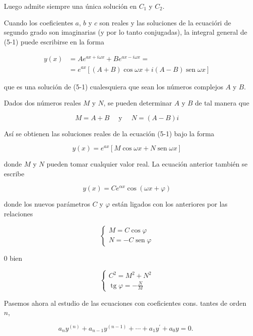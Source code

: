 \documentclass[10pt]{article}
\theoremstyle{plain}
\theoremstyle{definition}
\theoremstyle{remark}
\begin{document}
Luego admite siempre una única solución en $C_{1}$ y $C_{2}$.

Cuando los coeficientes $a$, $b$ y $c$ son reales y las soluciones de la ecuacióri de segundo grado son imaginarias (y por lo tanto conjugadas), la integral general de (5-1) puede escribirse en la forma

$$
\begin{aligned}
y(x) & =A e^{a x+i \omega x}+B e^{a x-i \omega x}= \\
& =e^{a x}[(A+B) \cos \omega x+i(A-B) \operatorname{sen} \omega x]
\end{aligned}
$$

que es una solución de (5-1) cualesquiera que sean los números complejos $A$ y $B$.

Dados dos números reales $M$ y $N$, se pueden determinar $A$ y $B$ de tal manera que

$$
M=A+B \quad \text { y } \quad N=(A-B) i
$$

Así se obtienen las soluciones reales de la ecuación (5-1) bajo la forma


\begin{equation*}
y(x)=e^{a x}[M \cos \omega x+N \operatorname{sen} \omega x] \tag{5-3}
\end{equation*}


donde $M$ y $N$ pueden tomar cualquier valor real. La ecuación anterior también se escribe


\begin{equation*}
y(x)=C e^{\alpha x} \cos (\omega x+\varphi) \tag{5-4}
\end{equation*}


donde los nuevos parámetros $C$ y $\varphi$ están ligados con los anteriores por las relaciones

$$
\left\{\begin{array}{l}
M=C \cos \varphi \\
N=-C \operatorname{sen} \varphi
\end{array}\right.
$$

0 bien

$$
\left\{\begin{array}{l}
C^{2}=M^{2}+N^{2} \\
\operatorname{tg} \varphi=-\frac{N}{M}
\end{array}\right.
$$


Pasemos ahora al estudio de las ecuaciones con coeficientes cons. tantes de orden $n$,


\begin{equation*}
a_{n} y^{(n)}+a_{n-1} y^{(n-1)}+\cdots+a_{1} y^{\prime}+a_{0} y=0 \text {. } \tag{5-5}
\end{equation*}
\end{document}
